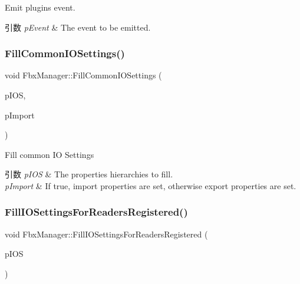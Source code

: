Emit plugins event. 
\begin{DoxyParams}{引数}
{\em p\+Event} & The event to be emitted. \\
\hline
\end{DoxyParams}
\mbox{\label{class_fbx_manager_a5d255c3afca682167094c1e78ac1c9aa}} 
\subsubsection{\texorpdfstring{Fill\+Common\+I\+O\+Settings()}{FillCommonIOSettings()}}
{\footnotesize\ttfamily void Fbx\+Manager\+::\+Fill\+Common\+I\+O\+Settings (\begin{DoxyParamCaption}\item[{\hyperlink{class_fbx_i_o_settings}{Fbx\+I\+O\+Settings} \&}]{p\+I\+OS,  }\item[{bool}]{p\+Import }\end{DoxyParamCaption})}

Fill common IO Settings 
\begin{DoxyParams}{引数}
{\em p\+I\+OS} & The properties hierarchies to fill. \\
\hline
{\em p\+Import} & If {\ttfamily true}, import properties are set, otherwise export properties are set. \\
\hline
\end{DoxyParams}
\mbox{\label{class_fbx_manager_a5af734dedf7cb2c21fc04cfba2265ff3}} 
\subsubsection{\texorpdfstring{Fill\+I\+O\+Settings\+For\+Readers\+Registered()}{FillIOSettingsForReadersRegistered()}}
{\footnotesize\ttfamily void Fbx\+Manager\+::\+Fill\+I\+O\+Settings\+For\+Readers\+Registered (\begin{DoxyParamCaption}\item[{\hyperlink{class_fbx_i_o_settings}{Fbx\+I\+O\+Settings} \&}]{p\+I\+OS }\end{DoxyParamCaption})}

